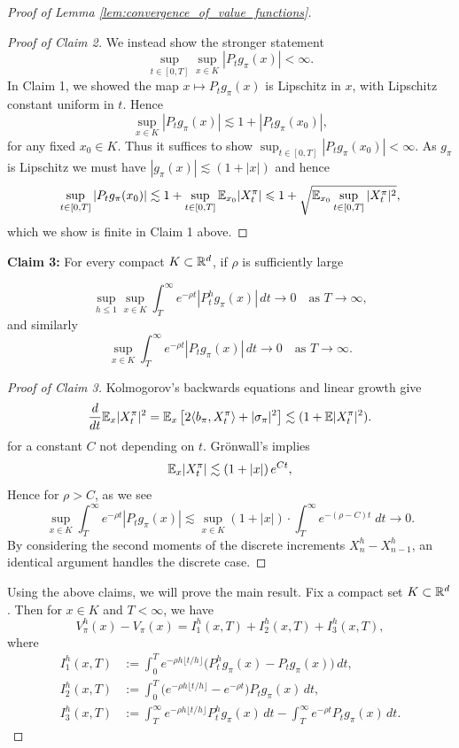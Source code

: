 \begin{proof}[Proof of Lemma \ref{lem:convergence_of_value_functions}]
	\begin{proof}[Proof of Claim 2]
		We instead show the stronger statement
		\[\sup_{t \in [0, T]} \sup_{x \in K} |P_t g_\pi(x)| < \infty.\]
		In Claim 1, we showed the map $x \mapsto P_tg_\pi(x)$ is Lipschitz in $x$, with Lipschitz constant
		uniform in $t$. Hence
		\[\sup_{x \in K} |P_t g_\pi(x)| \lesssim 1 + |P_t g_\pi(x_0)|,\]
		\noindent for any fixed $x_0 \in K$. Thus it suffices to show $\sup_{t \in [0,T]} |P_t g_\pi(x_0)| < \infty$. As $g_\pi$ is Lipschitz
		we must have $|g_\pi(x)| \lesssim (1 + |x|)$ and hence
		\[\sup_{t \in [0,T]} |P_t g_\pi(x_0)| \lesssim 1 + \sup_{t\in [0,T]} \mathbb{E}_{x_0}|X^\pi_t| \leqslant 1 + \sqrt{\mathbb{E}_{x_0}\sup_{t\in [0,T]} |X^\pi_t|^2}, \]
		\noindent which we show is finite in Claim 1 above.
	\end{proof}

	\noindent \textbf{Claim 3:} For every compact $K\subset \mathbb{R}^d$, if $\rho$ is sufficiently large

			\[
		\sup_{h\le 1}\sup_{x\in K}
		\int_T^\infty e^{-\rho t}|P_t^h g_\pi(x)|\,dt \to 0
		\quad \text{as } T\to\infty,
		\]
		and similarly
		\[
		\sup_{x\in K}
		\int_T^\infty e^{-\rho t}|P_t g_\pi(x)|\,dt \to 0
		\quad \text{as } T\to\infty.
		\]



	\begin{proof}[Proof of Claim 3]
		Kolmogorov's backwards equations and linear growth give
		\[\frac{d}{dt}\mathbb{E}_x |X^\pi_t|^2 = \mathbb{E}_x \left[2 \langle b_\pi, X^\pi_t\rangle + |\sigma_\pi|^2 \right] \lesssim (1 + \mathbb{E}|X_t^\pi|^2).\]
		for a constant $C$ not depending on $t$. Gr\"onwall's implies
		\[\mathbb{E}_x |X^\pi_t| \lesssim \left(1 + |x|\right) e^{Ct},\]
		\noindent Hence for $\rho > C$, as  we see
		\[\sup_{x \in K}\int_T^\infty e^{-\rho t} |P_t g_\pi(x)| \lesssim \sup_{x \in K} (1 + |x|) \cdot \int_T^\infty e^{-(\rho - C) t} \; dt \to 0.\]
		By considering the second moments of the discrete increments $X^h_n - X^h_{n-1}$, an identical argument handles the discrete case.
	\end{proof}

	\noindent Using the above claims, we will prove the main result. Fix a compact set $K\subset \mathbb{R}^d$. Then for $x\in K$ and $T<\infty$, we have
\[
V_\pi^h(x)-V_\pi(x)=I_1^h(x,T)+I_2^h(x,T)+I_3^h(x,T),
\]
where
\begin{align*}
I_1^h(x,T)
&:=
\int_0^T e^{-\rho h\lfloor t/h\rfloor}\big(P_t^h g_\pi(x)-P_t g_\pi(x)\big)\,dt, \\
I_2^h(x,T)
&:=
\int_0^T \big(e^{-\rho h\lfloor t/h\rfloor}-e^{-\rho t}\big)P_t g_\pi(x)\,dt, \\
I_3^h(x,T)
&:=
\int_T^\infty e^{-\rho h\lfloor t/h\rfloor}P_t^h g_\pi(x)\,dt
-
\int_T^\infty e^{-\rho t}P_t g_\pi(x)\,dt.
\end{align*}


\end{proof}
